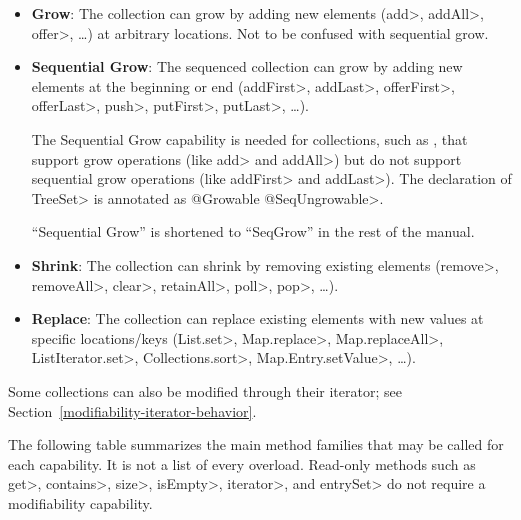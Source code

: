 \begin{itemize}
    \item \textbf{Grow}: The collection can grow by adding new elements
      (\<add>, \<addAll>, \<offer>, \ldots) at arbitrary locations.
       Not to be confused with sequential grow.
    \item \textbf{Sequential Grow}: The sequenced collection can grow by adding new
      elements at the beginning or end (\<addFirst>, \<addLast>,
      \<offerFirst>, \<offerLast>, \<push>, \<putFirst>,
      \<putLast>, \ldots).

      The Sequential Grow capability is needed for collections, such as
      , that
      support grow operations (like \<add> and \<addAll>) but do not
      support sequential grow operations (like \<addFirst> and
      \<addLast>).  The declaration of \<TreeSet> is annotated as \<@Growable @SeqUngrowable>.

      ``Sequential Grow'' is shortened to ``SeqGrow'' in the rest of the manual.
    \item \textbf{Shrink}: The collection can shrink by removing
      existing elements (\<remove>, \<removeAll>, \<clear>, \<retainAll>, \<poll>, \<pop>, \ldots).
    \item \textbf{Replace}: The collection can replace existing
      elements with new values at specific locations/keys (\<List.set>, \<Map.replace>, \<Map.replaceAll>,
       \<ListIterator.set>,  \<Collections.sort>, \<Map.Entry.setValue>, \ldots).
\end{itemize}

\noindent
Some collections can also be modified through their iterator; see Section~\ref{modifiability-iterator-behavior}.

The following table summarizes the main method families that may be called
for each capability.  It is not a list of every overload.  Read-only
methods such as \<get>, \<contains>, \<size>, \<isEmpty>, \<iterator>, and
\<entrySet> do not require a modifiability capability.

